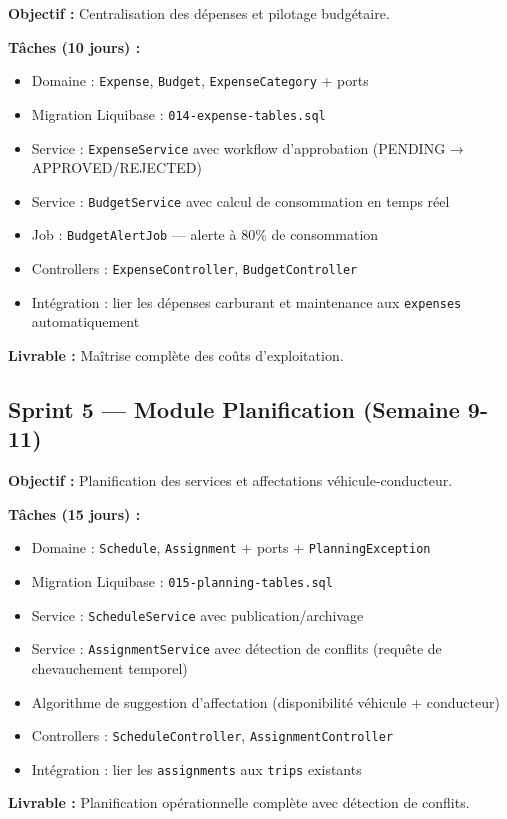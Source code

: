 \documentclass[12pt,a4paper]{report}
\begin{document}
\begin{tcolorbox}[colback=fleetwarning!5, colframe=fleetwarning, title={\bfseries Sprint 4 — Gestion Financière}]
\textbf{Objectif :} Centralisation des dépenses et pilotage budgétaire.

\textbf{Tâches (10 jours) :}
\begin{itemize}[leftmargin=1.5cm]
  \item Domaine : \texttt{Expense}, \texttt{Budget}, \texttt{ExpenseCategory} + ports
  \item Migration Liquibase : \texttt{014-expense-tables.sql}
  \item Service : \texttt{ExpenseService} avec workflow d'approbation (PENDING → APPROVED/REJECTED)
  \item Service : \texttt{BudgetService} avec calcul de consommation en temps réel
  \item Job : \texttt{BudgetAlertJob} — alerte à 80\% de consommation
  \item Controllers : \texttt{ExpenseController}, \texttt{BudgetController}
  \item Intégration : lier les dépenses carburant et maintenance aux \texttt{expenses} automatiquement
\end{itemize}

\textbf{Livrable :} Maîtrise complète des coûts d'exploitation.
\end{tcolorbox}

\subsection{Sprint 5 — Module Planification (Semaine 9-11)}

\begin{tcolorbox}[colback=fleetblue!5, colframe=fleetblue, title={\bfseries Sprint 5 — Planification et Ordonnancement}]
\textbf{Objectif :} Planification des services et affectations véhicule-conducteur.

\textbf{Tâches (15 jours) :}
\begin{itemize}[leftmargin=1.5cm]
  \item Domaine : \texttt{Schedule}, \texttt{Assignment} + ports + \texttt{PlanningException}
  \item Migration Liquibase : \texttt{015-planning-tables.sql}
  \item Service : \texttt{ScheduleService} avec publication/archivage
  \item Service : \texttt{AssignmentService} avec détection de conflits (requête de chevauchement temporel)
  \item Algorithme de suggestion d'affectation (disponibilité véhicule + conducteur)
  \item Controllers : \texttt{ScheduleController}, \texttt{AssignmentController}
  \item Intégration : lier les \texttt{assignments} aux \texttt{trips} existants
\end{itemize}

\textbf{Livrable :} Planification opérationnelle complète avec détection de conflits.
\end{tcolorbox}
\end{document}

